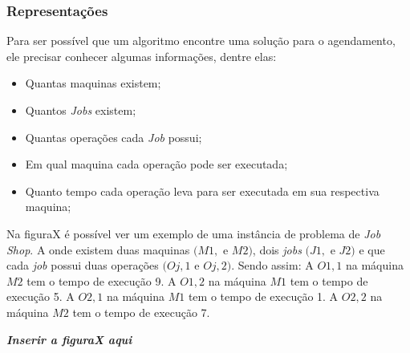         \subsubsection{Representações}
            Para ser possível que um algoritmo encontre uma solução para o agendamento, ele precisar conhecer algumas informações, dentre elas: 
            \begin{itemize}
                \item Quantas maquinas existem;
                \item Quantos \textit{Jobs} existem;
                \item Quantas operações cada \textit{Job} possui;
                \item Em qual maquina cada operação pode ser executada;
                \item Quanto tempo cada operação leva para ser executada em sua respectiva maquina;
            \end{itemize}


            Na figuraX é possível ver um exemplo de uma instância de problema de \textit{Job Shop}. A onde existem duas maquinas $(M1, $ e $M2)$, dois \textit{jobs} $(J1, $ e $J2)$ e que cada \textit{job} possui duas operações $(Oj,1 $ e $Oj,2)$.\newline
            Sendo assim:\newline
            A $O1,1$ na máquina $M2$ tem o tempo de execução 9.\newline 
            A $O1,2$ na máquina $M1$ tem o tempo de execução 5.\newline
            A $O2,1$ na máquina $M1$ tem o tempo de execução 1. \newline
            A $O2,2$ na máquina $M2$ tem o tempo de execução 7. \newline

            \textit{\textbf{Inserir a figuraX aqui}}\newline



